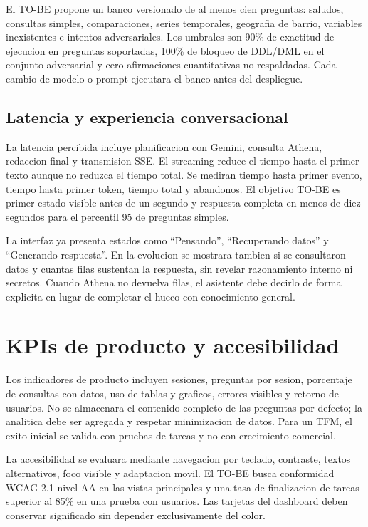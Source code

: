 El TO-BE propone un banco versionado de al menos cien preguntas: saludos, consultas simples, comparaciones, series temporales, geografia de barrio, variables inexistentes e intentos adversariales. Los umbrales son 90\% de exactitud de ejecucion en preguntas soportadas, 100\% de bloqueo de DDL/DML en el conjunto adversarial y cero afirmaciones cuantitativas no respaldadas. Cada cambio de modelo o prompt ejecutara el banco antes del despliegue.

\subsection{Latencia y experiencia conversacional}

La latencia percibida incluye planificacion con Gemini, consulta Athena, redaccion final y transmision SSE. El streaming reduce el tiempo hasta el primer texto aunque no reduzca el tiempo total. Se mediran tiempo hasta primer evento, tiempo hasta primer token, tiempo total y abandonos. El objetivo TO-BE es primer estado visible antes de un segundo y respuesta completa en menos de diez segundos para el percentil 95 de preguntas simples.

La interfaz ya presenta estados como ``Pensando'', ``Recuperando datos'' y ``Generando respuesta''. En la evolucion se mostrara tambien si se consultaron datos y cuantas filas sustentan la respuesta, sin revelar razonamiento interno ni secretos. Cuando Athena no devuelva filas, el asistente debe decirlo de forma explicita en lugar de completar el hueco con conocimiento general.

\section{KPIs de producto y accesibilidad}

Los indicadores de producto incluyen sesiones, preguntas por sesion, porcentaje de consultas con datos, uso de tablas y graficos, errores visibles y retorno de usuarios. No se almacenara el contenido completo de las preguntas por defecto; la analitica debe ser agregada y respetar minimizacion de datos. Para un TFM, el exito inicial se valida con pruebas de tareas y no con crecimiento comercial.

La accesibilidad se evaluara mediante navegacion por teclado, contraste, textos alternativos, foco visible y adaptacion movil. El TO-BE busca conformidad WCAG 2.1 nivel AA en las vistas principales y una tasa de finalizacion de tareas superior al 85\% en una prueba con usuarios. Las tarjetas del dashboard deben conservar significado sin depender exclusivamente del color.

